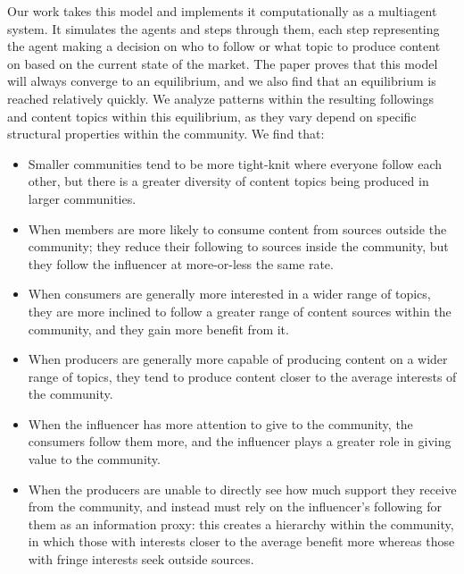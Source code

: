 \documentclass[11pt, letterpaper]{article}
\begin{document}
Our work takes this model and implements it computationally as a multiagent system. It simulates the agents and steps through them, each step representing the agent making a decision on who to follow or what topic to produce content on based on the current state of the market. The paper proves that this model will always converge to an equilibrium, and we also find that an equilibrium is reached relatively quickly. We analyze patterns within the resulting followings and content topics within this equilibrium, as they vary depend on specific structural properties within the community. We find that:
\begin{itemize}
    \item Smaller communities tend to be more tight-knit where everyone follow each other, but there is a greater diversity of content topics being produced in larger communities.
    \item When members are more likely to consume content from sources outside the community; they reduce their following to sources inside the community, but they follow the influencer at more-or-less the same rate.
    \item When consumers are generally more interested in a wider range of topics, they are more inclined to follow a greater range of content sources within the community, and they gain more benefit from it.
    \item When producers are generally more capable of producing content on a wider range of topics, they tend to produce content closer to the average interests of the community.
    \item When the influencer has more attention to give to the community, the consumers follow them more, and the influencer plays a greater role in giving value to the community.
    \item When the producers are unable to directly see how much support they receive from the community, and instead must rely on the influencer's following for them as an information proxy: this creates a hierarchy within the community, in which those with interests closer to the average benefit more whereas those with fringe interests seek outside sources.
\end{itemize}
\end{document}
